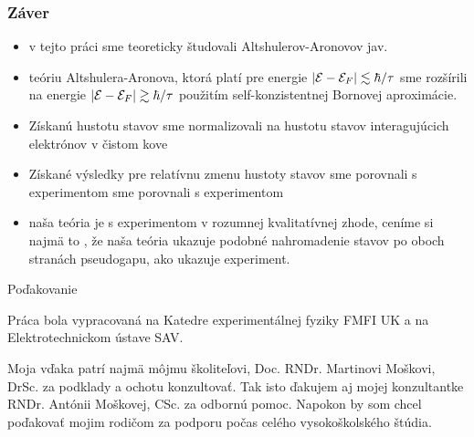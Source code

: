 \documentclass[
	11pt, %
]{beamer}
\begin{document}
\begin{frame}
\frametitle{Záver}
	\begin{itemize}
	\item v tejto práci sme teoreticky študovali Altshulerov-Aronovov jav.
	\item teóriu Altshulera-Aronova, ktorá platí pre energie $|\mathcal{E} - \mathcal{E}_F| \lesssim \hbar/\tau$ sme rozšírili na energie $|\mathcal{E} - \mathcal{E}_F| \gtrsim \hbar/\tau$
	použitím self-konzistentnej Bornovej aproximácie. 
	\item Získanú hustotu stavov sme normalizovali na hustotu stavov interagujúcich elektrónov v čistom kove
	\item Získané výsledky pre relatívnu zmenu hustoty stavov sme porovnali s experimentom sme porovnali s experimentom
	\item naša teória je s experimentom v rozumnej kvalitatívnej zhode, ceníme si najmä to , že naša teória ukazuje podobné nahromadenie stavov po oboch stranách pseudogapu, ako ukazuje experiment. 
	\end{itemize}
\end{frame}

\begin{frame}[plain] %
	\begin{center}
		{\Huge Poďakovanie}
		
		\bigskip\bigskip %
	\end{center}
Práca bola vypracovaná na Katedre experimentálnej fyziky FMFI UK a na Elektrotechnickom ústave SAV.

Moja vďaka patrí najmä môjmu školiteľovi, Doc. RNDr. Martinovi Moškovi, DrSc. za podklady a ochotu konzultovať.
Tak isto ďakujem aj mojej konzultantke RNDr. Antónii Moškovej, CSc. za odbornú pomoc. Napokon by som chcel poďakovať mojim rodičom
za podporu počas celého vysokoškolského štúdia.
\end{frame}
\end{document}
